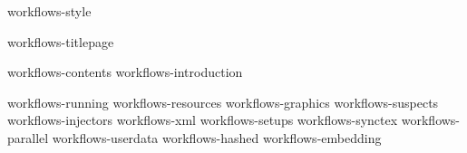 
%
%


\environment workflows-style

\startdocument
  [metadata:author=Hans Hagen,
   metadata:title=Workflow support in context,
   author=Hans Hagen,
   affiliation=PRAGMA ADE,
   location=Hasselt NL,
   title=workflow,
   extra=support in context,
   support=www.contextgarden.net,
   website=www.pragma-ade.nl]

\component workflows-titlepage

\startfrontmatter
    \component workflows-contents
    \component workflows-introduction
\stopfrontmatter

\startbodymatter
    \component workflows-running
    \component workflows-resources
    \component workflows-graphics
    \component workflows-suspects
    \component workflows-injectors
    \component workflows-xml
    \component workflows-setups
    \component workflows-synctex
    \component workflows-parallel
    \component workflows-userdata
    \component workflows-hashed
    \component workflows-embedding
\stopbodymatter

\stopdocument
